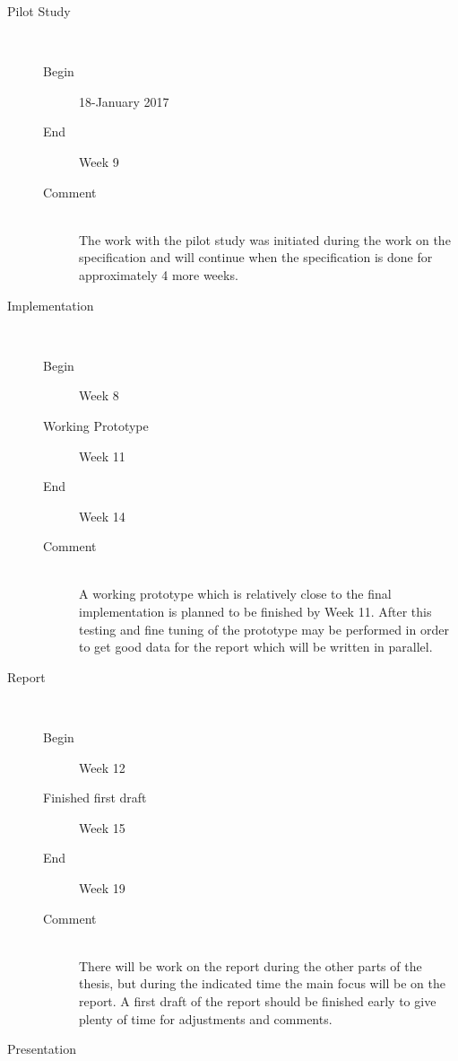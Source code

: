 \documentclass[a4paper,11pt]{report}
\begin{document}
\begin{description}
    \item[Pilot Study] \hfill\\
        \begin{description}
            \item[Begin] 18-January 2017
            \item[End] Week 9
            \item[Comment]\hfill \\
                The work with the pilot study was initiated during the work on 
                the specification and will continue when the specification is 
                done for approximately 4 more weeks.
        \end{description}
    \item[Implementation] \hfill\\
        \begin{description}
            \item[Begin] Week 8
            \item[Working Prototype] Week 11
            \item[End] Week 14
            \item[Comment]\hfill \\
                A working prototype which is relatively close to the final 
                implementation is planned to be finished by Week 11. After this
                testing and fine tuning of the prototype may be performed in 
                order to get good data for the report which will be written 
                in parallel.
        \end{description}
    \item[Report] \hfill\\
        \begin{description}
            \item[Begin] Week 12
            \item[Finished first draft] Week 15
            \item[End] Week 19
            \item[Comment]\hfill \\
                There will be work on the report during the other parts of the
                thesis, but during the indicated time the main focus will be 
                on the report. A first draft of the report should be finished
                early to give plenty of time for adjustments and comments.
        \end{description}
    \item[Presentation] \hfill\\

\end{description}
\end{document}
